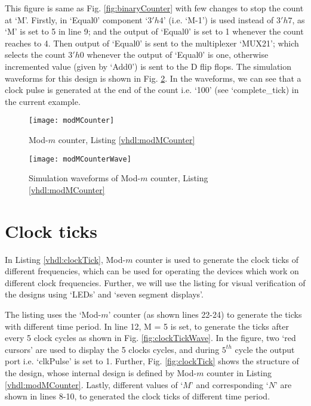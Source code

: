 \begin{explanation}
	This figure is same as Fig. \ref{fig:binaryCounter} with few changes to stop the count at `M'. Firstly, in `Equal0' component `$3'h4$' (i.e. `M-1') is used instead of $3'h7$, as `M' is set to 5 in line 9; and the output of `Equal0' is set to 1 whenever the count reaches to 4. Then output of `Equal0' is sent to the multiplexer `MUX21'; which selects the count $3'h0$ whenever the output of `Equal0' is one, otherwise incremented value (given by `Add0') is sent to the D flip flops. The simulation waveforms for this design is shown in Fig. \ref{fig:modMCounterWave}. In the waveforms, we can see that a clock pulse is generated at the end of the count i.e. `100' (see `complete\_tick) in the current example.
\end{explanation}
\begin{figure}[!h]
	\centering
	\texttt{[image: modMCounter]}
	\caption{Mod-$m$ counter, Listing \ref{vhdl:modMCounter}}
	\label{fig:modMCounter}
\end{figure}

\begin{figure}[!h]
	\centering
	\texttt{[image: modMCounterWave]}
	\caption{Simulation waveforms of Mod-$m$ counter, Listing \ref{vhdl:modMCounter}}
	\label{fig:modMCounterWave}
\end{figure}

\section{Clock ticks}
In Listing \ref{vhdl:clockTick}, Mod-$m$ counter is used to generate the clock ticks of different frequencies, which can be used for operating the devices which work on different clock frequencies. Further, we will use the listing for visual verification of the designs using `LEDs' and `seven segment displays'.

\begin{explanation}
	The listing uses the `Mod-$m$' counter (as shown lines 22-24) to generate the ticks with different time period. In line 12, M = 5 is set, to generate the ticks after every 5 clock cycles as shown in Fig. \ref{fig:clockTickWave}. In the figure, two `red cursors' are used to display the 5 clocks cycles, and during $5^{th}$ cycle the output port i.e. `clkPulse' is set to 1. Further, Fig. \ref{fig:clockTick} shows the structure of the design, whose internal design is defined by Mod-$m$ counter in Listing \ref{vhdl:modMCounter}. Lastly, different values of `$M$' and corresponding `$N$' are shown in lines 8-10, to generated the clock ticks of different time period.
\end{explanation}

